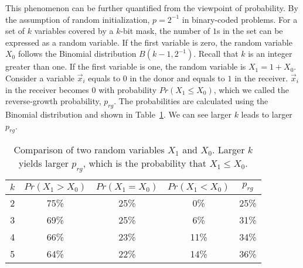 \documentclass{sig-alternate}
\begin{document}
This phenomenon can be further quantified from the viewpoint of probability.
By the assumption of random initialization, $p=2^{-1}$ in binary-coded problems.
For a set of $k$ variables covered by a $k$-bit mask,
the number of $1$s in the set can be expressed as a random variable.
If the first variable is zero, the random variable $X_0$ follows the Binomial distribution $B(k-1,2^{-1})$.
Recall that $k$ is an integer greater than one.
If the first variable is one, the random variable is $X_1=1+X_0$.
Consider a variable ${\vec x}_i$ equals to $0$ in the donor and equals to $1$ in the receiver.
${\vec x}_i$ in the receiver becomes $0$ with probability $Pr\left(X_1\leq X_0\right)$,
which we called the reverse-growth probability, $p_{rg}$.
The probabilities are calculated using the Binomial distribution and shown in Table~\ref{tbl:x1x0}.
We can see larger $k$ leads to larger $p_{rg}$. %

\begin{table}
\centering
\begin{tabular}{|c|c|c|c|c|} \hline
$k$ & $Pr(X_1>X_0)$ & $Pr(X_1=X_0)$ & $Pr(X_1<X_0)$ & $p_{rg}$\\ \hline
2 & 75\% & 25\% & 0\%   & 25\%\\
3 & 69\% & 25\% & 6\%   & 31\%\\
4 & 66\% & 23\% & 11\%  & 34\%\\
5 & 64\% & 22\% & 14\%  & 36\%\\ \hline
\end{tabular}
\caption{Comparison of two random variables $X_1$ and $X_0$.
Larger $k$ yields larger $p_{rg}$, which is the probability that $X_1 \leq X_0$.
}
\label{tbl:x1x0}
\end{table}
\end{document}
